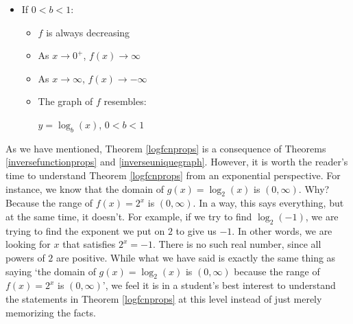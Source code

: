 {\begin{multicols}{2}
\begin{itemize}
\item  If $0<b<1$:

\begin{itemize}

\item  $f$ is always decreasing

\item  As $x \rightarrow 0^{+}$, $f(x) \rightarrow \infty$

\item  As $x \rightarrow \infty$, $f(x) \rightarrow -\infty$

\item  The graph of $f$ resembles:

\begin{center}

$y = \log_{b}(x)$, $0 < b < 1$
\end{center}
\end{itemize}

\end{itemize} 

\end{multicols}
}

\smallskip

As we have mentioned, Theorem \ref{logfcnprops} is a consequence of Theorems \ref{inversefunctionprops} and \ref{inverseuniquegraph}.  However, it is worth the reader's time to understand Theorem \ref{logfcnprops} from an exponential perspective.  For instance, we know that the domain of $g(x) = \log_{2}(x)$ is $(0,\infty)$.  Why?  Because the range of $f(x) = 2^{x}$ is $(0,\infty)$.  In a way, this says everything, but at the same time, it doesn't. For example, if we try to find $\log_{2}(-1)$, we are trying to find the exponent we put on $2$ to give us $-1$.  In other words, we are looking for $x$ that satisfies $2^{x} = -1$.  There is no such real number, since all powers of $2$ are positive.  While what we have said is exactly the same thing as saying `the domain of $g(x) = \log_{2}(x)$ is $(0,\infty)$ because the range of $f(x) = 2^{x}$ is $(0,\infty)$', we feel it is in a student's best interest to understand the statements in Theorem \ref{logfcnprops} at this level instead of just merely memorizing the facts.

\medskip

